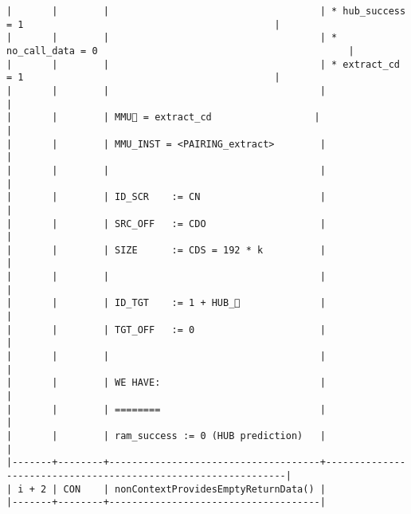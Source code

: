 \documentclass[varwidth=\maxdimen,margin=0.5cm,multi={verbatim}]{standalone}
\begin{document}
\begin{verbatim}
|       |        |                                     | * hub_success  = 1                                            |
|       |        |                                     | * no_call_data = 0                                            |
|       |        |                                     | * extract_cd   = 1                                            |
|       |        |                                     |                                                               |
|       |        | MMU🏴 = extract_cd                  |                                                               |
|       |        | MMU_INST = <PAIRING_extract>        |                                                               |
|       |        |                                     |                                                               |
|       |        | ID_SCR    := CN                     |                                                               |
|       |        | SRC_OFF   := CDO                    |                                                               |
|       |        | SIZE      := CDS = 192 * k          |                                                               |
|       |        |                                     |                                                               |
|       |        | ID_TGT    := 1 + HUB_              |                                                               |
|       |        | TGT_OFF   := 0                      |                                                               |
|       |        |                                     |                                                               |
|       |        | WE HAVE:                            |                                                               |
|       |        | ========                            |                                                               |
|       |        | ram_success := 0 (HUB prediction)   |                                                               |
|-------+--------+-------------------------------------+---------------------------------------------------------------|
| i + 2 | CON    | nonContextProvidesEmptyReturnData() |
|-------+--------+-------------------------------------|
\end{verbatim}
\end{document}
